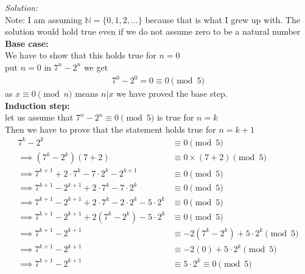 \documentclass[11pt,letterpaper]{article}
\newenvironment{solution}                      
        {\begin{mdframed}\textit{Solution:} \\}
        {\end{mdframed}}
\begin{document}
\begin{solution}
  Note: I am assuming $\mathbb{N} = \{0,1,2, \dots\}$ because that is what I grew up with. The solution would hold true even if we do not assume zero to be a natural number\\
  \textbf{Base case:}\\
  We have to show that this holds true for $n = 0$\\ 
  put $n = 0$ in $7^n - 2^n$ we get 
  \begin{align*}
    7^0 - 2^0 = 0 \equiv 0 \pmod 5
  \end{align*}
  as $x \equiv 0 \pmod n$ means $n \vert x$ we have proved the base step.\\
  \noindent\textbf{Induction step:}\\
  let us assume that $7^n - 2^n \equiv 0 \pmod 5$ is true for $n = k$\\
  Then we have to prove that the statement holds true for $n = k + 1$\\
  \begin{align*}
    7^k - 2^k &\equiv 0 \pmod 5 \tag{1}\\
    \implies (7^k - 2^k)(7+2) &\equiv 0\times(7+2) \pmod 5 \\
    \implies 7^{k+1} + 2\cdot7^k - 7\cdot2^k - 2^{k+1} &\equiv 0 \pmod 5\\
    \implies 7^{k+1} - 2^{k+1} + 2\cdot7^k - 7\cdot2^k &\equiv 0 \pmod 5\\
    \implies 7^{k+1} - 2^{k+1} + 2\cdot7^k - 2\cdot2^k - 5\cdot2^k &\equiv 0 \pmod 5\\
    \implies 7^{k+1} - 2^{k+1} + 2(7^k - 2^k) - 5\cdot2^k &\equiv 0 \pmod 5\\
    \implies 7^{k+1} - 2^{k+1} &\equiv - 2(7^k - 2^k) + 5\cdot2^k \pmod 5\\
    \implies 7^{k+1} - 2^{k+1} &\equiv - 2(0) + 5\cdot2^k \pmod 5 \tag{from (1)}\\
    \implies 7^{k+1} - 2^{k+1} &\equiv 5\cdot2^k \equiv 0 \pmod 5 \\
  \end{align*}
\end{solution}
\end{document}
